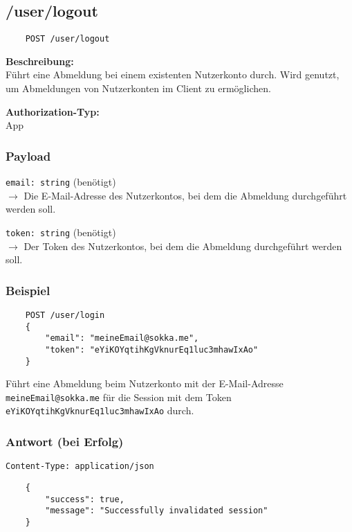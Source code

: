 \subsection{/user/logout}
\label{appauth}

\begin{lstlisting}
    POST /user/logout
\end{lstlisting}

\textbf{Beschreibung:} \\
Führt eine Abmeldung bei einem existenten Nutzerkonto durch. Wird genutzt, um Abmeldungen von Nutzerkonten im Client zu ermöglichen.

\textbf{Authorization-Typ:} \\
App

\subsubsection{Payload}

\lstinline{email: string} (benötigt) \\
$\rightarrow$ Die E-Mail-Adresse des Nutzerkontos, bei dem die Abmeldung durchgeführt werden soll.

\lstinline{token: string} (benötigt) \\
$\rightarrow$ Der Token des Nutzerkontos, bei dem die Abmeldung durchgeführt werden soll.

\subsubsection{Beispiel}

\begin{lstlisting}
    POST /user/login
    {
        "email": "meineEmail@sokka.me",
        "token": "eYiKOYqtihKgVknurEq1luc3mhawIxAo"
    }
\end{lstlisting}

Führt eine Abmeldung beim Nutzerkonto mit der E-Mail-Adresse \lstinline{meineEmail@sokka.me} für die Session mit dem Token \lstinline{eYiKOYqtihKgVknurEq1luc3mhawIxAo} durch.

\subsubsection{Antwort (bei Erfolg)}

\lstinline{Content-Type: application/json}
\begin{lstlisting}
    {
        "success": true, 
        "message": "Successfully invalidated session"
    }
\end{lstlisting}
